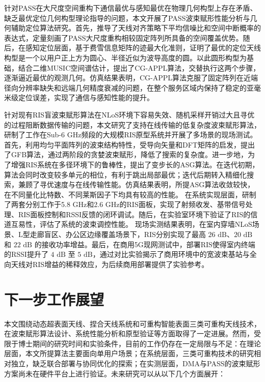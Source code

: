 针对PASS在大尺度空间重构下通信最优与感知最优在物理几何构型上存在矛盾、缺乏最优定位几何构型理论指导的问题，本文开展了PASS波束赋形性能分析与几何辅助定位算法研究。首先，推导了天线对齐策略下平均信噪比和空间中断概率的表达式，定量刻画了PASS大尺度重构相较固定阵列所具备的空间覆盖优势。随后，在感知定位层面，基于费雪信息矩阵的迹最大化准则，证明了最优的定位天线构型是一个以用户正上方为圆心、半径近似为波导高度的圆。以此圆形构型为基础，结合二维MUSIC空间谱估计，提出了CG-APPL算法，交替执行这两个步骤，逐渐逼近最优的观测几何。仿真结果表明，CG-APPL算法克服了固定阵列在近端径向分辨率缺失和远端几何精度衰减的问题，在整个服务区域内保持了稳定的亚毫米级定位误差，实现了通信与感知性能的提升。


针对现有RIS盲波束赋形算法在NLoS环境下容易失效、随机采样开销过大且寻优的过程阻断数据传输的问题，本文研究了支持在线传输的低复杂度波束赋形算法，研制了工作在Sub-6 GHz频段的大规模RIS原型系统并开展了多场景的现场测试。首先，利用均匀平面阵列的波束结构特性，受导向矢量和DFT矩阵的启发，提出了GFB算法，通过两阶段的贪婪波束赋形，降低了搜索的复杂度。进一步地，为了增强RIS系统在多径环境下的鲁棒性，提出了变步长的ASG算法。在迭代初期，算法会同时改变较多单元的相位，有利于跳出局部最优；迭代后期转入精细化搜索，兼顾了寻优速度与在线传输性能。仿真结果表明，所提ASG算法收敛较快，在不同量化比特数、不同莱斯因子下均具有较高的性能。
在系统实现层面，研制了两套分别工作于5.8 GHz和2.6 GHz的RIS面板，实现了射频收发、基带信号处理、RIS面板控制和RSSI反馈的闭环调试。随后，在实验室环境下验证了RIS的信道互易性，评估了系统的波束调控性能。
现场实测结果表明，在室内穿墙NLoS场景、L型走廊盲区、办公区边缘覆盖场景下，RIS分别实现了最高 $26 \text{ dB}$、$20 \text{ dB}$ 和 $22 \text{ dB}$ 的接收功率增益。最后，在商用5G现网测试中，部署RIS使得室内终端的RSSI提升了 $4 \text{ dB}$ 至 $5 \text{ dB}$，通过对比实验揭示了商用环境中的宽波束基站与全向天线对RIS增益的稀释效应，为后续商用部署提供了实验参考。


\section{下一步工作展望}

本文围绕动态超表面天线、捏合天线系统和可重构智能表面三类可重构天线技术，在波束赋形算法设计、系统性能分析和原型验证等方面取得了一定进展。然而，受限于博士期间的研究时间和实验条件，目前的工作仍存在一定局限与不足：在理论层面，本文所提算法主要面向单用户场景；在系统层面，三类可重构技术的研究相对独立，缺乏联合部署与协同优化的探索；在实测层面，DMA与PASS的波束赋形方案尚未在硬件平台上进行验证。未来研究可以从以下几个方面展开：

